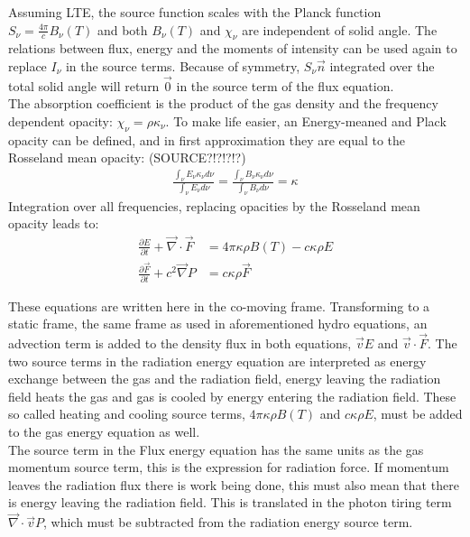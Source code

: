 Assuming LTE, the source function scales with the Planck function $S_\nu = \frac{4\pi}{c} B_\nu(T)$ and both $B_\nu(T)$ and $\chi_\nu$ are independent of solid angle. The relations between flux, energy and the moments of intensity can be used again to replace $I_\nu$ in the source terms. Because of symmetry, $S_\nu \vec{n}$ integrated over the total solid angle will return $\vec{0}$ in the source term of the flux equation.\\
The absorption coefficient is the product of the gas density and the frequency dependent opacity: $\chi_\nu = \rho \kappa_\nu$. To make life easier, an Energy-meaned and Plack opacity can be defined, and in first approximation they are equal to the Rosseland mean opacity: (SOURCE?!?!?!?)
\begin{align}
\frac{\int_\nu E_\nu \kappa_\nu d\nu}{\int_\nu E_\nu d\nu} = \frac{\int_\nu B_\nu \kappa_\nu d\nu}{\int_\nu B_\nu d\nu} = \kappa
\end{align}
Integration over all frequencies, replacing opacities by the Rosseland mean opacity leads to:
\begin{align}
\frac{\partial E}{\partial t} + \vec{\nabla} \cdot \vec{F} &= 4\pi \kappa\rho B(T) - c \kappa \rho E\\
\frac{\partial \vec{F}}{\partial t} + c^2 \vec{\nabla} P &=  c \kappa \rho \vec{F} 
\end{align}

These equations are written here in the co-moving frame. Transforming to a static frame, the same frame as used in aforementioned hydro equations, an advection term is added to the density flux in  both equations, $\vec{v} E$ and $\vec{v} \cdot \vec{F}$. The two source terms in the radiation energy equation are interpreted as energy exchange between the gas and the radiation field, energy leaving the radiation field heats the gas and gas is cooled by energy entering the radiation field. These so called heating and cooling source terms, $4\pi \kappa\rho B(T)$ and $ c \kappa \rho E$, must be added to the gas energy equation as well. \\
The source term in the Flux energy equation has the same units as the gas momentum source term, this is the expression for radiation force. If momentum leaves the radiation flux there is work being done, this must also mean that there is energy leaving the radiation field. This is translated in the photon tiring term $\vec{\nabla} \cdot \vec{v} P$, which must be subtracted from the radiation energy source term.

